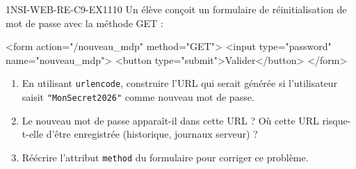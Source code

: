 

\begin{exercice}{1NSI-WEB-RE-C9-EX1}{1}{10}
Un élève conçoit un formulaire de réinitialisation de mot de passe avec la méthode GET :
\begin{console}
<form action="/nouveau_mdp" method="GET">
    <input type="password" name="nouveau_mdp">
    <button type="submit">Valider</button>
</form>
\end{console}
\begin{enumerate}
  \item En utilisant \lstinline{urlencode}, construire l'URL qui serait générée si l'utilisateur saisit \lstinline{"MonSecret2026"} comme nouveau mot de passe.
  \item Le nouveau mot de passe apparaît-il dans cette URL ? Où cette URL risque-t-elle d'être enregistrée (historique, journaux serveur) ?
  \item Réécrire l'attribut \lstinline{method} du formulaire pour corriger ce problème.
\end{enumerate}
\end{exercice}

